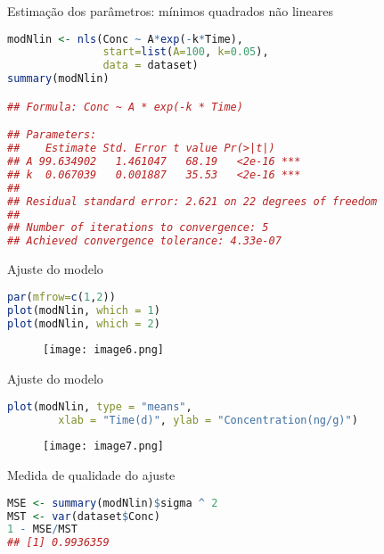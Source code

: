 \documentclass[xcolor=dvipsnames]{beamer}
\begin{document}
         \begin{frame}[fragile]{Estimação dos parâmetros: mínimos quadrados não lineares}
           \begin{lstlisting}[language=R]
modNlin <- nls(Conc ~ A*exp(-k*Time), 
               start=list(A=100, k=0.05), 
               data = dataset)
summary(modNlin)

## Formula: Conc ~ A * exp(-k * Time)

## Parameters:
##    Estimate Std. Error t value Pr(>|t|)    
## A 99.634902   1.461047   68.19   <2e-16 ***
## k  0.067039   0.001887   35.53   <2e-16 ***
## 
## Residual standard error: 2.621 on 22 degrees of freedom
## 
## Number of iterations to convergence: 5 
## Achieved convergence tolerance: 4.33e-07
           \end{lstlisting}
        \end{frame}

        \begin{frame}[fragile]{Ajuste do modelo}
           \begin{lstlisting}[language=R]
par(mfrow=c(1,2))
plot(modNlin, which = 1)
plot(modNlin, which = 2)
           \end{lstlisting}
           \begin{figure}[h]
           \texttt{[image: image6.png]}        
          \end{figure}
           
        \end{frame}

         \begin{frame}[fragile]{Ajuste do modelo}
           \begin{lstlisting}[language=R]
plot(modNlin, type = "means",
        xlab = "Time(d)", ylab = "Concentration(ng/g)")
           \end{lstlisting}
           \begin{figure}[h]
           \texttt{[image: image7.png]}        
          \end{figure}
           
        \end{frame}
                   
          \begin{frame}[fragile]{Medida de qualidade do ajuste}
           \begin{lstlisting}[language=R]
MSE <- summary(modNlin)$sigma ^ 2
MST <- var(dataset$Conc)
1 - MSE/MST
## [1] 0.9936359
           \end{lstlisting}
        \end{frame}
\end{document}
